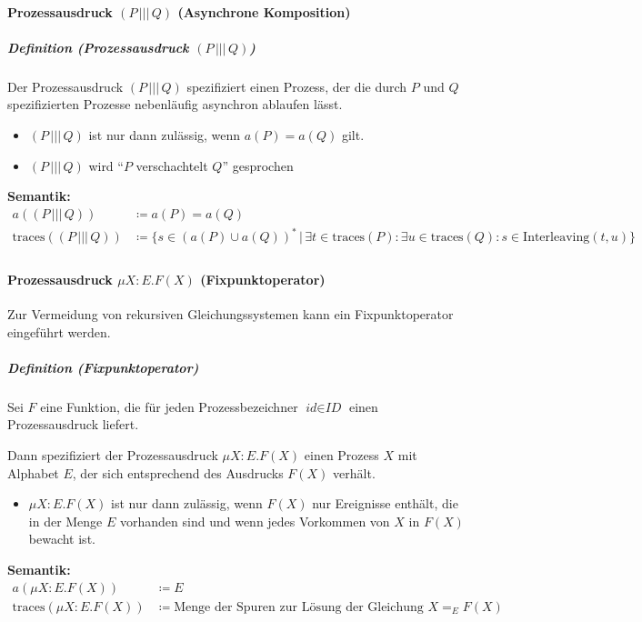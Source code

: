 \documentclass[a4paper, 11pt, accentcolor = tud3b]{tudreport}
\newcommand{\forwhich}{\ensuremath{{\,\vert\,}}}
\newcommand{\parallelAsync}{\ensuremath{\,\lvert\vert\rvert\,}}
\newcommand{\subsubparagraph}[1]{\hspace{1cm} \textbf{#1:}}
\newcommand{\definition}[2]{\subparagraph{Definition (#1)} #2}
\begin{document}
				    \paragraph{Prozessausdruck $ (P \parallelAsync Q) $ (Asynchrone Komposition)}
					    \definition{Prozessausdruck $ (P \parallelAsync Q) $}{
					    	Der Prozessausdruck $ (P \parallelAsync Q) $ spezifiziert einen Prozess, der die durch $ P $ und $ Q $ spezifizierten Prozesse nebenläufig asynchron ablaufen lässt.
					    	\begin{itemize}
					    		\item $ (P \parallelAsync Q) $ ist nur dann zulässig, wenn $ a(P) = a(Q) $ gilt.
					    		\item $ (P \parallelAsync Q) $ wird \enquote{$ P $ verschachtelt $ Q $} gesprochen
					    	\end{itemize}
					    	
					    	\subsubparagraph{Semantik}
						    	\begin{align*}
							    	a((P \parallelAsync Q)) &\coloneqq a(P) = a(Q) \\
							    	\text{traces}((P \parallelAsync Q)) &\coloneqq \{ s \in (a(P) \cup a(Q)) ^ * \forwhich \exists t \in \text{traces}(P) : \exists u \in \text{traces}(Q) : s \in \text{Interleaving}(t, u) \} \\
						    	\end{align*}
					    }
				    
				    \paragraph{Prozessausdruck $ \mu X : E.F(X) $ (Fixpunktoperator)}
					    Zur Vermeidung von rekursiven Gleichungssystemen kann ein Fixpunktoperator eingeführt werden.
					    
					    \definition{Fixpunktoperator}{
					    	Sei $ F $ eine Funktion, die für jeden Prozessbezeichner $ \textit{id} \in \textit{ID} $ einen Prozessausdruck liefert.
					    	
					    	Dann spezifiziert der Prozessausdruck $ \mu X : E.F(X) $ einen Prozess $ X $ mit Alphabet $ E $, der sich entsprechend des Ausdrucks $ F(X) $ verhält.
					    	\begin{itemize}
					    		\item $ \mu X : E.F(X) $ ist nur dann zulässig, wenn $ F(X) $ nur Ereignisse enthält, die in der Menge $ E $ vorhanden sind und wenn jedes Vorkommen von $ X $ in $ F(X) $ bewacht ist.
					    	\end{itemize}
					    	
					    	\subsubparagraph{Semantik}
						    	\begin{align*}
							    	a(\mu X : E.F(X)) &\coloneqq E \\
							    	\text{traces}(\mu X : E.F(X)) &\coloneqq \text{Menge der Spuren zur Lösung der Gleichung } X = _ E F(X) \\
						    	\end{align*}
					    }
			    
\end{document}
